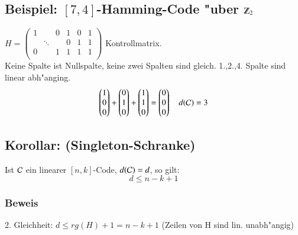 \subsection{Beispiel: $[7,4]$-Hamming-Code "uber $\Z_2$}
$H =
\begin{pmatrix}
1 & & 0 & 1 & 0 & 1\\
   &\ddots &    & 0 & 1 & 1\\
0 & & 1 & 1 & 1 & 1\\
\end{pmatrix}$ Kontrollmatrix.\\
Keine Spalte ist Nullspalte, keine zwei Spalten sind  gleich. 1.,2.,4. Spalte sind linear abh"anging.
\[
	\begin{pmatrix}
	1\\
	0\\
	0\\
	\end{pmatrix} +
	\begin{pmatrix}
	0\\
	1\\
	0\\
	\end{pmatrix} +
	\begin{pmatrix}
	1\\
	1\\
	0\\
	\end{pmatrix} =
	\begin{pmatrix}
	0\\
	0\\
	0\\
	\end{pmatrix} \quad d(\mathcal{C})=3
\]
\subsection{Korollar: (Singleton-Schranke)}
Ist $\mathcal{C}$ ein linearer $[n,k]$-Code, $d(\mathcal{C})=d$, so gilt:
\[
	d \leq n-k + 1
\]
\subsubsection{Beweis}
2. Gleichheit: $d \leq rg(H)+1=n-k+1$ (Zeilen von H sind lin. unabh"angig)

